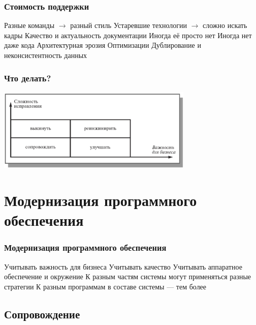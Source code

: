 \documentclass{../../slides-style}
\begin{document}
    \begin{frame}
        \frametitle{Стоимость поддержки}
        \begin{outline}
            \1 Разные команды $\to$ разный стиль
            \1 Устаревшие технологии $\to$ сложно искать кадры
            \1 Качество и актуальность документации
                \2 Иногда её просто нет
                \2 Иногда нет даже кода
            \1 Архитектурная эрозия
            \1 Оптимизации
            \1 Дублирование и неконсистентность данных
        \end{outline}
    \end{frame}

    \begin{frame}
        \frametitle{Что делать?}
        \begin{center}
            \includegraphics[width=0.7\textwidth]{maintenanceWays.png}
        \end{center}
    \end{frame}

    \section{Модернизация программного обеспечения}

    \begin{frame}
        \frametitle{Модернизация программного обеспечения}
        \begin{outline}
            \1 Учитывать важность для бизнеса
            \1 Учитывать качество
            \1 Учитывать аппаратное обеспечение и окружение
            \1 К разным частям системы могут применяться разные стратегии
                \2 К разным программам в составе системы --- тем более
        \end{outline}
    \end{frame}

    \subsection{Сопровождение}
\end{document}
